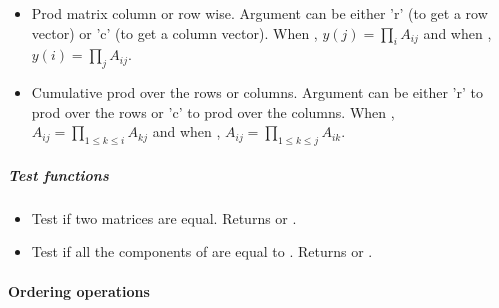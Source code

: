 \begin{itemize}
\item {}
  \sshortdescribe Prod matrix column or row wise. Argument  can be
  either 'r' (to get a row vector) or 'c' (to get a column vector). When
  , $y(j) = \prod_i A_{ij}$ and when , $y(i) = \prod_j
  A_{ij}$.

\item {} 
  \sshortdescribe Cumulative prod over the rows or columns. Argument 
  can be either 'r' to prod over the rows or 'c' to prod over the columns. When
  , $A_{ij} = \prod_{1 \le k \le i} A_{kj}$ and when , 
  $A_{ij} = \prod_{1 \le k \le j} A_{ik}$.
\end{itemize}

\subparagraph{Test functions}

\begin{itemize}
\item {}
  \sshortdescribe Test if two matrices are equal. Returns  or
  .
\item {}
  \sshortdescribe Test if all the components of  are equal to
  . Returns  or .
\end{itemize}


\paragraph{Ordering operations}

